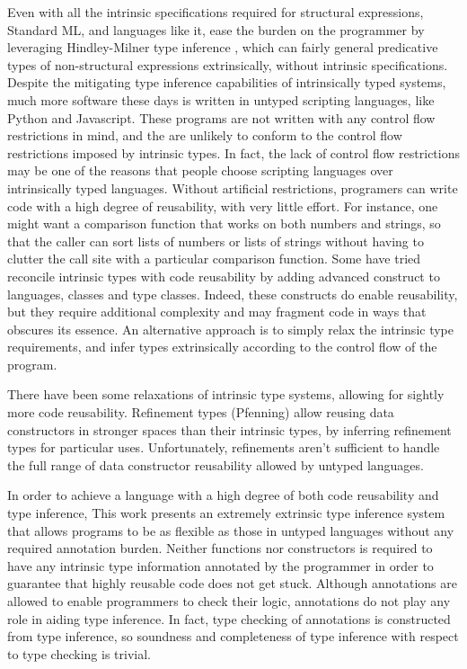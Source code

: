 \documentclass[acmsmall]{acmart}
\theoremstyle{definition}
\begin{document}
Even with all the intrinsic specifications required for structural expressions, Standard ML,
and languages like it, ease the burden on the programmer by leveraging Hindley-Milner
type inference \cite{}, which can fairly general predicative types of 
non-structural expressions extrinsically, without intrinsic specifications. 
Despite the mitigating type inference capabilities of intrinsically typed systems, 
much more software these days is written
in untyped scripting languages, like Python and Javascript. 
These programs are not written with any control flow restrictions in mind,
and the are unlikely to conform to the control flow restrictions imposed by intrinsic types.
In fact, the lack of control flow restrictions may be one of the reasons that people
choose scripting languages over intrinsically typed languages.
Without artificial restrictions, programers can write code with a high degree of reusability,
with very little effort.
For instance, one might want a comparison function that works on both numbers and strings,
so that the caller can sort lists of numbers or lists of strings without having to
clutter the call site with a particular comparison function.  
Some have tried reconcile intrinsic types with code reusability by adding
advanced construct to languages, classes and type classes.
Indeed, these constructs do enable reusability, but they require additional
complexity and may fragment code in ways that obscures its essence.   
An alternative approach is to simply relax the intrinsic type requirements,
and infer types extrinsically according to the control flow of the program. 


There have been some relaxations of intrinsic type systems, allowing for sightly more code reusability.
Refinement types (Pfenning) \cite{} allow reusing data constructors in stronger spaces than their intrinsic types, by
inferring refinement types for particular uses.
Unfortunately, refinements aren't sufficient to handle the full range of data constructor reusability allowed by untyped languages.

In order to achieve a language with a high degree of both code reusability and type inference, 
This work presents an extremely extrinsic type inference system
that allows programs to be as flexible as those in untyped languages
without any required annotation burden. 
Neither functions nor constructors is required to have
any intrinsic type information annotated by the programmer in order
to guarantee that highly reusable code does not get stuck.
Although annotations are allowed to enable programmers to check their logic,
annotations do not play any role in aiding type inference. In fact, 
type checking of annotations is constructed from type inference, 
so soundness and completeness of type inference with respect to type checking is trivial.  
\end{document}
